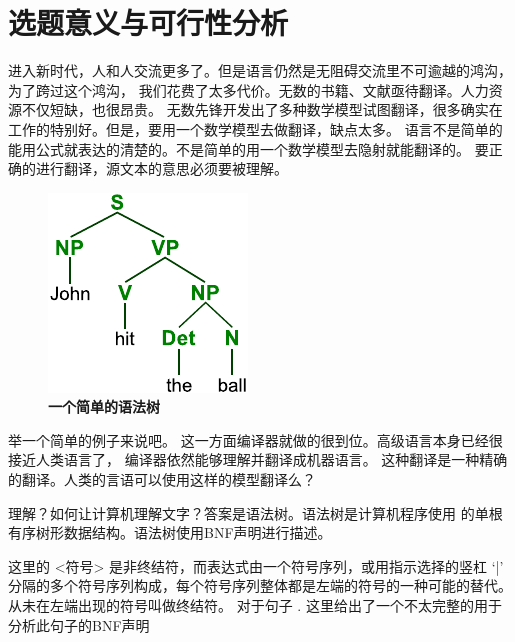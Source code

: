 
\section{选题意义与可行性分析}

进入新时代，人和人交流更多了。但是语言仍然是无阻碍交流里不可逾越的鸿沟，为了跨过这个鸿沟，
我们花费了太多代价。无数的书籍、文献亟待翻译。人力资源不仅短缺，也很昂贵。
无数先锋开发出了多种数学模型试图翻译，很多确实在工作的特别好。但是，要用一个数学模型去做翻译，缺点太多。
语言不是简单的能用公式就表达的清楚的。不是简单的用一个数学模型去隐射就能翻译的。
要正确的进行翻译，源文本的意思必须要被理解。

\begin{figure}%
\begin{center}%
\includegraphics{../ParseTree}%
\\\textbf{一个简单的语法树}%
\end{center}%
\end{figure}%
举一个简单的例子来说吧。
这一方面编译器就做的很到位。高级语言本身已经很接近人类语言了，
编译器依然能够理解并翻译成机器语言。
这种翻译是一种精确的翻译。人类的言语可以使用这样的模型翻译么？

\nocite{Compilers_Principles_Techniques_and_Tools}


理解？如何让计算机理解文字？答案是语法树\cite{cst}。语法树是计算机程序使用
的单根有序树形数据结构。语法树使用BNF\cite{BNF}声明进行描述。

\framedparbox{
 <symbol> ::= \_\_expression\_\_ 
 }
 
  这里的 <符号> 是非终结符，而表达式由一个符号序列，或用指示选择的竖杠 `|' 分隔的多个符号序列构成，每个符号序列整体都是左端的符号的一种可能的替代。从未在左端出现的符号叫做终结符。 
 对于句子 . 这里给出了一个不太完整的用于分析此句子的BNF声明 \\

\fbox{\begin{minipage}{12cm}
ENDPUNC ::= '.' | '?' 

S ::= NP VP ENDPUNC | NP ENDPUNC | VP ENDPUNC | ...  < more >

NP ::= Det N | N  | Pron | < more >

Det ::= "the" | "an" | "a" | "this" | ... ...  < more >

V ::= "hit" | ...... < more >

N ::= "ball" | .... < more >

Pron ::= I | "you" | ..... <more>

.... <more>

\end{minipage} }


